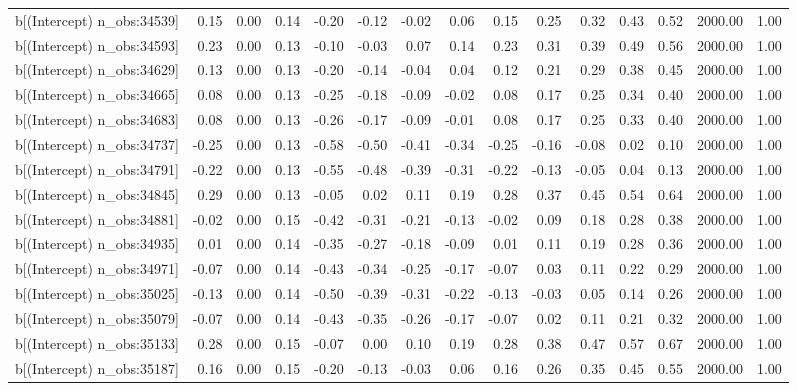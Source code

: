 \begin{table}[ht]
\begin{tabular}{rrrrrrrrrrrrrrr}
  b[(Intercept) n\_obs:34539] & 0.15 & 0.00 & 0.14 & -0.20 & -0.12 & -0.02 & 0.06 & 0.15 & 0.25 & 0.32 & 0.43 & 0.52 & 2000.00 & 1.00 \\ 
  b[(Intercept) n\_obs:34593] & 0.23 & 0.00 & 0.13 & -0.10 & -0.03 & 0.07 & 0.14 & 0.23 & 0.31 & 0.39 & 0.49 & 0.56 & 2000.00 & 1.00 \\ 
  b[(Intercept) n\_obs:34629] & 0.13 & 0.00 & 0.13 & -0.20 & -0.14 & -0.04 & 0.04 & 0.12 & 0.21 & 0.29 & 0.38 & 0.45 & 2000.00 & 1.00 \\ 
  b[(Intercept) n\_obs:34665] & 0.08 & 0.00 & 0.13 & -0.25 & -0.18 & -0.09 & -0.02 & 0.08 & 0.17 & 0.25 & 0.34 & 0.40 & 2000.00 & 1.00 \\ 
  b[(Intercept) n\_obs:34683] & 0.08 & 0.00 & 0.13 & -0.26 & -0.17 & -0.09 & -0.01 & 0.08 & 0.17 & 0.25 & 0.33 & 0.40 & 2000.00 & 1.00 \\ 
  b[(Intercept) n\_obs:34737] & -0.25 & 0.00 & 0.13 & -0.58 & -0.50 & -0.41 & -0.34 & -0.25 & -0.16 & -0.08 & 0.02 & 0.10 & 2000.00 & 1.00 \\ 
  b[(Intercept) n\_obs:34791] & -0.22 & 0.00 & 0.13 & -0.55 & -0.48 & -0.39 & -0.31 & -0.22 & -0.13 & -0.05 & 0.04 & 0.13 & 2000.00 & 1.00 \\ 
  b[(Intercept) n\_obs:34845] & 0.29 & 0.00 & 0.13 & -0.05 & 0.02 & 0.11 & 0.19 & 0.28 & 0.37 & 0.45 & 0.54 & 0.64 & 2000.00 & 1.00 \\ 
  b[(Intercept) n\_obs:34881] & -0.02 & 0.00 & 0.15 & -0.42 & -0.31 & -0.21 & -0.13 & -0.02 & 0.09 & 0.18 & 0.28 & 0.38 & 2000.00 & 1.00 \\ 
  b[(Intercept) n\_obs:34935] & 0.01 & 0.00 & 0.14 & -0.35 & -0.27 & -0.18 & -0.09 & 0.01 & 0.11 & 0.19 & 0.28 & 0.36 & 2000.00 & 1.00 \\ 
  b[(Intercept) n\_obs:34971] & -0.07 & 0.00 & 0.14 & -0.43 & -0.34 & -0.25 & -0.17 & -0.07 & 0.03 & 0.11 & 0.22 & 0.29 & 2000.00 & 1.00 \\ 
  b[(Intercept) n\_obs:35025] & -0.13 & 0.00 & 0.14 & -0.50 & -0.39 & -0.31 & -0.22 & -0.13 & -0.03 & 0.05 & 0.14 & 0.26 & 2000.00 & 1.00 \\ 
  b[(Intercept) n\_obs:35079] & -0.07 & 0.00 & 0.14 & -0.43 & -0.35 & -0.26 & -0.17 & -0.07 & 0.02 & 0.11 & 0.21 & 0.32 & 2000.00 & 1.00 \\ 
  b[(Intercept) n\_obs:35133] & 0.28 & 0.00 & 0.15 & -0.07 & 0.00 & 0.10 & 0.19 & 0.28 & 0.38 & 0.47 & 0.57 & 0.67 & 2000.00 & 1.00 \\ 
  b[(Intercept) n\_obs:35187] & 0.16 & 0.00 & 0.15 & -0.20 & -0.13 & -0.03 & 0.06 & 0.16 & 0.26 & 0.35 & 0.45 & 0.55 & 2000.00 & 1.00 \\ 

\end{tabular}
\end{table}
